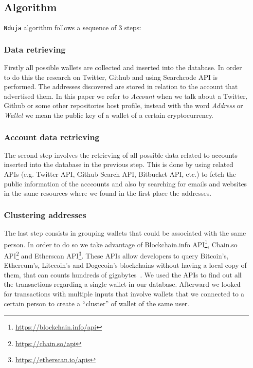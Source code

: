 \subsection{Algorithm}
\texttt{Nduja} algorithm follows a sequence of 3 steps:
\subsubsection*{Data retrieving} Firstly all possible wallets are collected
and inserted into the database. In order to do this the research on
Twitter, Github and using Searchcode API is performed. The addresses
discovered are stored in relation to the account that advertised them.
In this paper we refer to \textit{Account} when we talk about a Twitter, Github
or some other repositories host profile, instead with the word \textit{Address}
or \textit{Wallet} we mean the public key of a wallet of a certain
cryptocurrency.
\subsubsection*{Account data retrieving} The second step involves the
retrieving of all possible data related to accounts inserted into the database
in the previous step. This is done by using related APIs
(e.g. Twitter API, Github Search API, Bitbucket API, etc.) to fetch the public
information of the acccounts and also by searching for emails and websites in
the same resources where we found in the first place the addresses.

\subsubsection*{Clustering addresses} The last step consists in grouping
wallets that could be associated with the same person. In order to do so we
take advantage of
Blockchain.info API\footnote{\url{https://blockchain.info/api}},
Chain.so API\footnote{\url{https://chain.so/api}} and
Etherscan API\footnote{\url{https://etherscan.io/apis}}. These APIs allow
developers to query Bitcoin's, Ethereum's, Litecoin's and Dogecoin's
blockchains without having a local copy of them, that can counts
hundreds of gigabytes~\cite{bib:bitinfochart}. We used the APIs to find out all
the transactions regarding a single wallet in our database.
Afterward we looked for transactions with multiple inputs that
involve wallets that we connected to a certain person to create a
``cluster'' of wallet of the same user.
